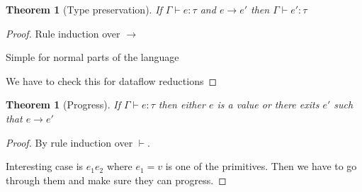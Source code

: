 \documentclass[
		twoside,openright,titlepage,numbers=noenddot,headinclude,%
                footinclude=true,cleardoublepage=empty,
                BCOR=10mm,paper=a4,fontsize=10pt, %
                ngerman,american, %
                ]{scrreprt}
\newcounter{mythmcounter}
\newtheorem{theorem}[mythmcounter]{Theorem}
\begin{document}
\begin{theorem}[Type preservation]
  If $\Gamma \vdash e : \tau$ and $e \rightarrow e'$ then $\Gamma \vdash e' : \tau$
\end{theorem}
\begin{proof}
  Rule induction over $\rightarrow$
  
Simple for normal parts of the language

We have to check this for dataflow reductions  
\end{proof}

\begin{theorem}[Progress]
  If $\Gamma \vdash e : \tau$ then either $e$ is a value or there exits $e'$ such that $e \rightarrow e'$
\end{theorem}
\begin{proof}
  By rule induction over $\vdash$.
  
Interesting case is $e_1 e_2$ where $e_1 = v$ is one of the primitives. Then we have to go through
them and make sure they can progress.  
\end{proof}
\end{document}
